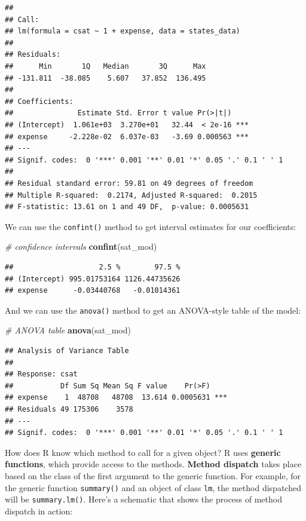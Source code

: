 \documentclass[
]{book}
\newenvironment{Shaded}{\begin{snugshade}}{\end{snugshade}}
\newcommand{\CommentTok}[1]{\textcolor[rgb]{0.56,0.35,0.01}{\textit{#1}}}
\newcommand{\KeywordTok}[1]{\textcolor[rgb]{0.13,0.29,0.53}{\textbf{#1}}}
\newcommand{\NormalTok}[1]{#1}
\begin{document}
\begin{verbatim}
## 
## Call:
## lm(formula = csat ~ 1 + expense, data = states_data)
## 
## Residuals:
##      Min       1Q   Median       3Q      Max 
## -131.811  -38.085    5.607   37.852  136.495 
## 
## Coefficients:
##               Estimate Std. Error t value Pr(>|t|)    
## (Intercept)  1.061e+03  3.270e+01   32.44  < 2e-16 ***
## expense     -2.228e-02  6.037e-03   -3.69 0.000563 ***
## ---
## Signif. codes:  0 '***' 0.001 '**' 0.01 '*' 0.05 '.' 0.1 ' ' 1
## 
## Residual standard error: 59.81 on 49 degrees of freedom
## Multiple R-squared:  0.2174, Adjusted R-squared:  0.2015 
## F-statistic: 13.61 on 1 and 49 DF,  p-value: 0.0005631
\end{verbatim}

We can use the \texttt{confint()} method to get interval estimates for our coefficients:

\begin{Shaded}
\begin{Highlighting}[]
  \CommentTok{\# confidence intervals}
  \KeywordTok{confint}\NormalTok{(sat\_mod) }
\end{Highlighting}
\end{Shaded}

\begin{verbatim}
##                    2.5 %        97.5 %
## (Intercept) 995.01753164 1126.44735626
## expense      -0.03440768   -0.01014361
\end{verbatim}

And we can use the \texttt{anova()} method to get an ANOVA-style table of the model:

\begin{Shaded}
\begin{Highlighting}[]
  \CommentTok{\# ANOVA table}
  \KeywordTok{anova}\NormalTok{(sat\_mod)   }
\end{Highlighting}
\end{Shaded}

\begin{verbatim}
## Analysis of Variance Table
## 
## Response: csat
##           Df Sum Sq Mean Sq F value    Pr(>F)    
## expense    1  48708   48708  13.614 0.0005631 ***
## Residuals 49 175306    3578                      
## ---
## Signif. codes:  0 '***' 0.001 '**' 0.01 '*' 0.05 '.' 0.1 ' ' 1
\end{verbatim}

How does R know which method to call for a given object? R uses \textbf{generic functions}, which provide access to the methods. \textbf{Method dispatch} takes place based on the class of the first argument to the generic function. For example, for the generic function \texttt{summary()} and an object of class \texttt{lm}, the method dispatched will be \texttt{summary.lm()}. Here's a schematic that shows the process of method dispatch in action:
\end{document}
